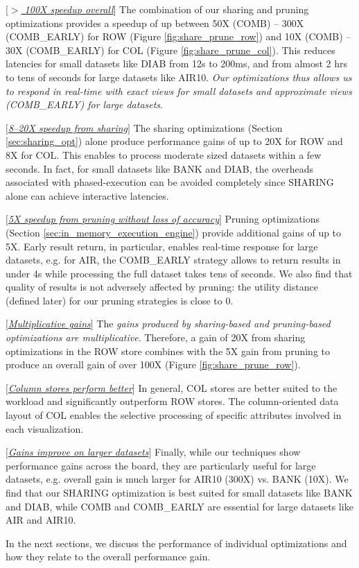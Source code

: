 \begin{denselist} 
\item $[$\underline{\em $>$ 100X speedup overall}$]$ The combination of our sharing and pruning optimizations provides a speedup of up 
between 50X (COMB) -- 300X (COMB\_EARLY) for ROW (Figure \ref{fig:share_prune_row}) and 
10X (COMB) -- 30X (COMB\_EARLY) for COL (Figure \ref{fig:share_prune_col}).
This reduces latencies for small datasets like DIAB from 12s to 200ms, and from almost 2 hrs to tens of seconds for large datasets 
like AIR10. 
{\it Our optimizations thus allows us to respond in real-time with exact views for small datasets and approximate views (COMB\_EARLY) for large datasets}.
\item $[$\underline{\em 8--20X speedup from sharing}$]$ The sharing optimizations (Section \ref{sec:sharing_opt}) alone produce performance gains of up to 20X for ROW and 8X for COL. This enables \SeeDB to process moderate sized datasets within a few seconds.
In fact, for small datasets like BANK and DIAB, the overheads associated with phased-execution can be avoided completely since SHARING
alone can achieve interactive latencies.
\item $[$\underline{\em 5X speedup from pruning without loss of accuracy}$]$ Pruning optimizations (Section \ref{sec:in_memory_execution_engine}) provide additional gains of up to 5X. Early result return, in particular, enables real-time response for large datasets, e.g. for AIR, the COMB\_EARLY strategy allows \SeeDB to return results in under 4s while processing the full dataset takes tens of seconds. We also find that quality of results is not adversely affected by pruning: the utility distance (defined later) for our pruning strategies is close to 0.
\item $[$\underline{\em Multiplicative gains}$]$ The {\it gains produced by sharing-based and pruning-based optimizations are multiplicative}. Therefore, a gain of 20X from sharing optimizations in the ROW store combines with the 5X gain from pruning to produce an overall gain of over 100X (Figure \ref{fig:share_prune_row}).
\item $[$\underline{\em Column stores perform better}$]$ In general, COL stores are better suited to the \SeeDB workload and 
significantly outperform ROW stores. The column-oriented data layout of COL enables the selective processing of specific attributes involved in each visualization. 
\item $[$\underline{\em Gains improve on larger datasets}$]$ Finally, while our techniques show performance gains across the board, they are particularly useful for large datasets, e.g. overall gain is much larger for AIR10 (300X) vs. BANK (10X). We find that our SHARING optimization is best suited for small datasets like BANK and DIAB, while COMB and COMB\_EARLY are essential for large datasets like AIR and AIR10.
\end{denselist}



In the next sections, we discuss the performance of individual optimizations and how they relate to the overall performance gain.



